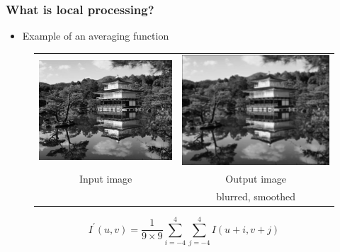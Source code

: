 \documentclass[english,11pt,table,handout]{beamer}
\begin{document}
\frame
{
	\frametitle{What is local processing?}
	\begin{itemize}
		\item Example of an averaging function
	\end{itemize}
	\centering
	\begin{figure}[!h]
		\begin{tabular}{cc}
			\includegraphics[scale=0.11]{kyoto_gray.jpg} &
			\includegraphics[scale=0.11]{kyoto_gray_smooth_9.jpg} \\
			Input image & Output image \\
						& blurred, smoothed
		\end{tabular}
	\end{figure}
	
	\begin{equation*}
	I^{'}{(u,v)} = \frac{1}{9\times 9}\sum_{i=-4}^{4}{\sum_{j=-4}^{4}{I(u+i, v+j)}}
	\end{equation*}
}
\end{document}
